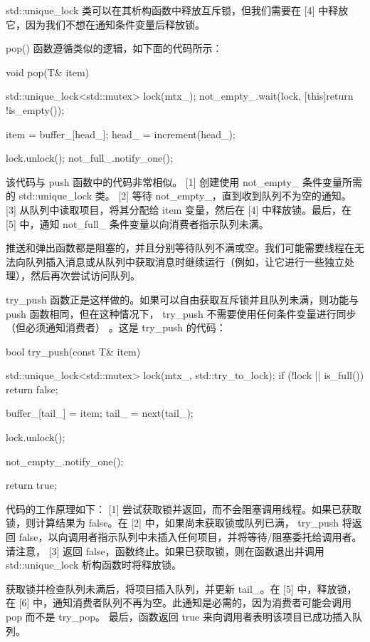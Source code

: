std::unique\_lock 类可以在其析构函数中释放互斥锁，但我们需要在 [4] 中释放它，因为我们不想在通知条件变量后释放锁。

pop() 函数遵循类似的逻辑，如下面的代码所示：

\begin{cpp}
void pop(T& item)
{
    std::unique_lock<std::mutex> lock(mtx_);
    not_empty_.wait(lock, [this]{return !is_empty()});

    item = buffer_[head_];
    head_ = increment(head_);

    lock.unlock();
    not_full_.notify_one();
}
\end{cpp}

该代码与 push 函数中的代码非常相似。 [1] 创建使用 not\_empty\_ 条件变量所需的 std::unique\_lock 类。 [2] 等待 not\_empty\_，直到收到队列不为空的通知。 [3] 从队列中读取项目，将其分配给 item 变量，然后在 [4] 中释放锁。最后，在 [5] 中，通知 not\_full\_ 条件变量以向消费者指示队列未满。

推送和弹出函数都是阻塞的，并且分别等待队列不满或空。我们可能需要线程在无法向队列插入消息或从队列中获取消息时继续运行（例如，让它进行一些独立处理），然后再次尝试访问队列。

try\_push 函数正是这样做的。如果可以自由获取互斥锁并且队列未满，则功能与 push 函数相同，但在这种情况下， try\_push 不需要使用任何条件变量进行同步（但必须通知消费者） 。这是 try\_push 的代码：

\begin{cpp}
bool try_push(const T& item) {
    std::unique_lock<std::mutex> lock(mtx_, std::try_to_lock);
    if (!lock || is_full()) {
        return false;
    }

    buffer_[tail_] = item;
    tail_ = next(tail_);

    lock.unlock();

    not_empty_.notify_one();

    return true;
}
\end{cpp}

代码的工作原理如下： [1] 尝试获取锁并返回，而不会阻塞调用线程。如果已获取锁，则计算结果为 false。在 [2] 中，如果尚未获取锁或队列已满， try\_push 将返回 false，以向调用者指示队列中未插入任何项目，并将等待/阻塞委托给调用者。请注意， [3] 返回 false，函数终止。如果已获取锁，则在函数退出并调用 std::unique\_lock 析构函数时将释放锁。

获取锁并检查队列未满后，将项目插入队列，并更新 tail\_。在 [5] 中，释放锁，在 [6] 中，通知消费者队列不再为空。此通知是必需的，因为消费者可能会调用 pop 而不是 try\_pop。
最后，函数返回 true 来向调用者表明该项目已成功插入队列。

